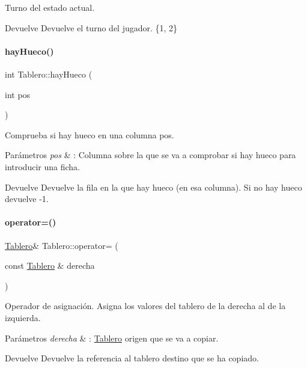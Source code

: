 Turno del estado actual. 

\begin{DoxyReturn}{Devuelve}
Devuelve el turno del jugador. \{1, 2\} 
\end{DoxyReturn}
\hypertarget{classTablero_ada687d3c234c4fb416ca76461adf6ba4}{}\label{classTablero_ada687d3c234c4fb416ca76461adf6ba4} 
\paragraph{\texorpdfstring{hay\+Hueco()}{hayHueco()}}
{\footnotesize\ttfamily int Tablero\+::hay\+Hueco (\begin{DoxyParamCaption}\item[{int}]{pos }\end{DoxyParamCaption})}



Comprueba si hay hueco en una columna \textquotesingle{}pos\textquotesingle{}. 


\begin{DoxyParams}{Parámetros}
{\em pos} & \+: Columna sobre la que se va a comprobar si hay hueco para introducir una ficha. \\
\hline
\end{DoxyParams}
\begin{DoxyReturn}{Devuelve}
Devuelve la fila en la que hay hueco (en esa columna). Si no hay hueco devuelve -\/1. 
\end{DoxyReturn}
\hypertarget{classTablero_abd7c6bb5bc26c0500308848399e1fd4f}{}\label{classTablero_abd7c6bb5bc26c0500308848399e1fd4f} 
\paragraph{\texorpdfstring{operator=()}{operator=()}}
{\footnotesize\ttfamily \hyperlink{classTablero}{Tablero}\& Tablero\+::operator= (\begin{DoxyParamCaption}\item[{const \hyperlink{classTablero}{Tablero} \&}]{derecha }\end{DoxyParamCaption})}



Operador de asignación. Asigna los valores del tablero de la derecha al de la izquierda. 


\begin{DoxyParams}{Parámetros}
{\em derecha} & \+: \hyperlink{classTablero}{Tablero} origen que se va a copiar. \\
\hline
\end{DoxyParams}
\begin{DoxyReturn}{Devuelve}
Devuelve la referencia al tablero destino que se ha copiado. 
\end{DoxyReturn}
\hypertarget{classTablero_a5de543f8186142731ab3ac77944a11b1}{}\label{classTablero_a5de543f8186142731ab3ac77944a11b1} 
